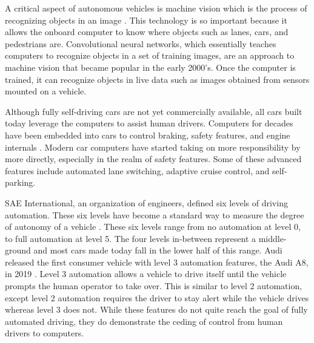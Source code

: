 \documentclass{mla}
\begin{document}
A critical aspect of autonomous vehicles is machine vision which is the process of recognizing objects in an image \cite{Goodfellow2016}. This technology is so important because it allows the onboard computer to know where objects such as lanes, cars, and pedestrians are. Convolutional neural networks, which essentially teaches computers to recognize objects in a set of training images, are an approach to machine vision that became popular in the early 2000's. Once the computer is trained, it can recognize objects in live data such as images obtained from sensors mounted on a vehicle.

Although fully self-driving cars are not yet commercially available, all cars built today leverage the computers to assist human drivers. Computers for decades have been embedded into cars to control braking, safety features, and engine internals \cite{NHTSA2019}. Modern car computers have started taking on more responsibility by more directly, especially in the realm of safety features. Some of these advanced features include automated lane switching, adaptive cruise control, and self-parking.

SAE International, an organization of engineers, defined six levels of driving automation. These six levels have become a standard way to measure the degree of autonomy of a vehicle \cite{SAEInternational2018}. These six levels range from no automation at level 0, to full automation at level 5. The four levels in-between represent a middle-ground and most cars made today fall in the lower half of this range. Audi released the first consumer vehicle with level 3 automation features, the Audi A8, in 2019 \cite{Davies2018}. Level 3 automation allows a vehicle to drive itself until the vehicle prompts the human operator to take over. This is similar to level 2 automation, except level 2 automation requires the driver to stay alert while the vehicle drives whereas level 3 does not. While these features do not quite reach the goal of fully automated driving, they do demonstrate the ceding of control from human drivers to computers.
\end{document}
